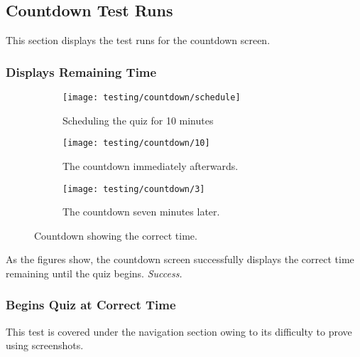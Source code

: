 \clearpage
\subsection{Countdown Test Runs} %
\label{sub:countdown_test_runs}
This section displays the test runs for the countdown screen.

\subsubsection{Displays Remaining Time} %
\label{ssub:displays_remaining_time}
\begin{figure}[!htbp]
\centering
\begin{subfigure}{0.5\textwidth}
  \centering
  \texttt{[image: testing/countdown/schedule]}
  \caption{Scheduling the quiz for 10 minutes}
  \label{fig:sub1}
\end{subfigure}%
\begin{subfigure}{0.5\textwidth}
  \centering
  \texttt{[image: testing/countdown/10]}
  \caption{The countdown immediately afterwards.}
  \label{fig:sub2}
\end{subfigure}
\begin{subfigure}{0.5\textwidth}
  \centering
  \texttt{[image: testing/countdown/3]}
  \caption{The countdown seven minutes later.}
  \label{fig:sub3}
\end{subfigure}
\caption{Countdown showing the correct time.}
\label{fig:test}
\end{figure}
As the figures show, the countdown screen successfully displays the correct time remaining until the quiz begins. \textit{Success.}

\subsubsection{Begins Quiz at Correct Time} %
\label{ssub:begins_quiz_at_correct_time}
This test is covered under the navigation section owing to its difficulty to prove using screenshots.
